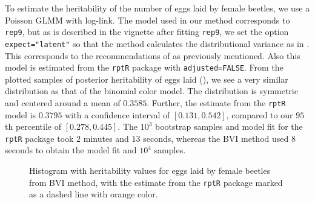 \noindent To estimate the heritability of the number of eggs laid by female beetles, we use a Poisson GLMM with log-link. The model used in our method corresponds to \texttt{rep9}, but as is described in the vignette after fitting \texttt{rep9}, we set the option \texttt{expect="latent"} so that the method calculates the distributional variance as in . This corresponds to the recommendations of \citet{nakagawa2017} as previously mentioned. Also this model is estimated from the \texttt{rptR} package with \texttt{adjusted=FALSE}. From the plotted samples of posterior heritability of eggs laid (), we see a very similar distribution as that of the binomial color model. The distribution is symmetric and centered around a mean of $0.3585$. Further, the estimate from the \texttt{rptR} model is $0.3795$ with a confidence interval of $[0.131, 0.542]$, compared to our $95$th percentile of $[0.278, 0.445]$. The $10^3$ bootstrap samples and model fit for the \texttt{rptR} package took $2$ minutes and $13$ seconds, whereas the BVI method used $8$ seconds to obtain the model fit and $10^4$ samples.
\begin{figure}[H]
  \centering
  \caption[Estimated repeatability of eggs laid by female beetles]{Histogram with heritability values for eggs laid by female beetles from BVI method, with the estimate from the \texttt{rptR} package marked as a dashed line with orange color.}
\end{figure}
